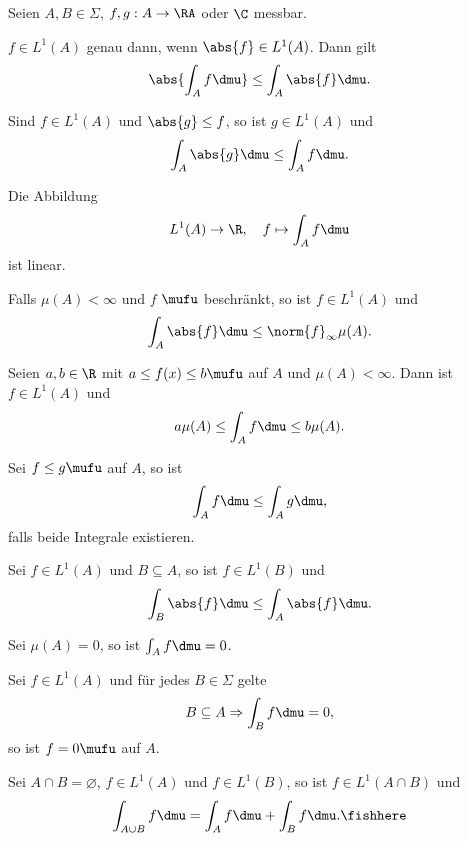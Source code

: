 \begin{prop}[Eigenschaften]
\label{prop:7.14}
Seien $A,B\in\Sigma$, $f,g:A\to\RA$ oder $\C$ messbar.
\begin{propenum}
\item $f\in L^1(A)$ genau dann, wenn $\abs{f}\in L^1(A)$. Dann gilt
\begin{align*}
\abs{\int_A f\dmu} \le \int_A \abs{f}\dmu.
\end{align*}
\item Sind $f\in L^1(A)$ und $\abs{g}\le f$, so ist $g\in L^1(A)$ und
\begin{align*}
\int_A \abs{g}\dmu \le \int_A f\dmu.
\end{align*}
\item Die Abbildung
\begin{align*}
L^1(A) \to \R,\quad f\mapsto \int_A f\dmu 
\end{align*}
ist linear.
\item Falls $\mu(A)<\infty$ und $f$ $\mufu$ beschränkt, so ist $f\in L^1(A)$ und
\begin{align*}
\int_A \abs{f}\dmu \le \norm{f}_\infty \mu(A).
\end{align*}
\item Seien $a,b\in\R$ mit $a\le f(x)\le b\mufu$ auf $A$ und $\mu(A)<\infty$.
Dann ist $f\in L^1(A)$ und
\begin{align*}
a\mu(A) \le \int_A f\dmu \le b\mu(A).
\end{align*}
\item Sei $f\le g\mufu$ auf $A$, so ist
\begin{align*}
\int_A f\dmu \le \int_A g\dmu,
\end{align*}
falls beide Integrale existieren.
\item Sei $f\in L^1(A)$ und $B\subseteq A$, so ist $f\in L^1(B)$ und
\begin{align*}
\int_B \abs{f}\dmu \le \int_A \abs{f}\dmu.
\end{align*}
\item Sei $\mu(A) = 0$, so ist $\int_A f\dmu = 0$.
\item Sei $f\in L^1(A)$ und für jedes $B\in \Sigma$ gelte
\begin{align*}
B\subseteq A \Rightarrow \int_B f\dmu = 0,
\end{align*}
so ist $f=0\mufu$ auf $A$.
\item Sei $A\cap B = \varnothing$, $f\in L^1(A)$ und $f\in L^1(B)$, so ist
$f\in L^1(A\cap B)$ und
\begin{align*}
\int_{A\cup B} f \dmu = \int_A f\dmu + \int_B f\dmu.\fishhere
\end{align*} 
\end{propenum}
\end{prop}

